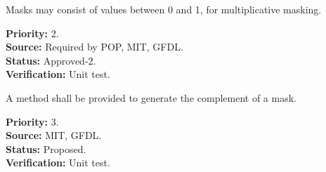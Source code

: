 Masks may consist of values between 0 and 1, for multiplicative masking.
\begin{reqlist}
{\bf Priority:} 2. \\
{\bf Source:} Required by POP, MIT, GFDL. \\
{\bf Status:} Approved-2. \\
{\bf Verification:} Unit test. 
\end{reqlist}

A method shall be provided to generate the complement of a mask.
\begin{reqlist}
{\bf Priority:} 3. \\
{\bf Source:} MIT, GFDL. \\
{\bf Status:} Proposed. \\
{\bf Verification:} Unit test.
\end{reqlist}


